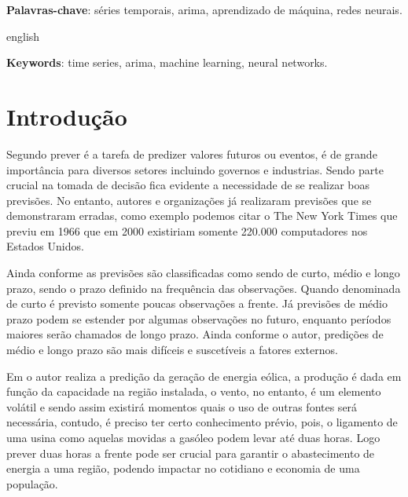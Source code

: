 \documentclass[
    12pt,
    oneside,
    a4paper,
    english,
    brazil
]{abntex2}
\begin{document}
\frenchspacing

\imprimircapa{}

\imprimirfolhaderosto{}

\begin{resumo}

    \textbf{Palavras-chave}: séries temporais, arima, aprendizado de máquina,
    redes neurais.
\end{resumo}

\begin{resumo}[Abstract]
    \begin{otherlanguage*}{english}

        \textbf{Keywords}: time series, arima, machine learning, neural
        networks.
    \end{otherlanguage*}
\end{resumo}

\textual{}

\tableofcontents*
\cleardoublepage{}

\chapter{Introdução}

Segundo  prever é a tarefa de predizer valores futuros ou
eventos, é de grande importância para diversos setores incluindo governos e
industrias. Sendo parte crucial na tomada de decisão fica evidente a
necessidade de se realizar boas previsões. No entanto, autores e organizações
já realizaram previsões que se demonstraram erradas, como exemplo podemos citar
o The New York Times que previu em 1966 que em 2000 existiriam somente 220.000
computadores nos Estados Unidos.

Ainda conforme  as previsões são classificadas como sendo de
curto, médio e longo prazo, sendo o prazo definido na frequência das
observações.  Quando denominada de curto é previsto somente poucas observações
a frente. Já previsões de médio prazo podem se estender por algumas observações
no futuro, enquanto períodos maiores serão chamados de longo prazo. Ainda
conforme o autor, predições de médio e longo prazo são mais difíceis e
suscetíveis a fatores externos.

Em  o autor realiza a predição da geração de
energia eólica, a produção é dada em função da capacidade na região instalada,
o vento, no entanto, é um elemento volátil e sendo assim existirá momentos
quais o uso de outras fontes será necessária, contudo, é preciso ter certo
conhecimento prévio, pois, o ligamento de uma usina como aquelas movidas a
gasóleo podem levar até duas horas. Logo prever duas horas a frente pode ser
crucial para garantir o abastecimento de energia a uma região, podendo impactar
no cotidiano e economia de uma população.
\end{document}
